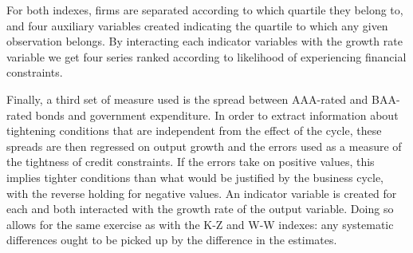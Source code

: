 \documentclass{_latex/house}
\begin{document}
For both indexes, firms are separated according to which quartile they belong to, and four auxiliary variables created indicating the quartile to which any given observation belongs. By interacting each indicator variables with the growth rate variable we get four series ranked according to likelihood of experiencing financial constraints.

Finally, a third set of measure used is the spread between AAA-rated and BAA-rated bonds and government expenditure. In order to extract information about tightening conditions that are independent from the effect of the cycle, these spreads are then regressed on output growth and the errors used as a measure of the tightness of credit constraints. If the errors take on positive values, this implies tighter conditions than what would be justified by the business cycle, with the reverse holding for negative values. An indicator variable is created for each and both interacted with the growth rate of the output variable. Doing so allows for the same exercise as with the K-Z and W-W indexes: any systematic differences ought to be picked up by the difference in the estimates.
\end{document}
